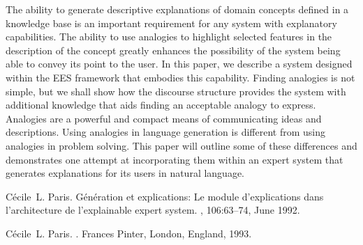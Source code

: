 \begin{thebibliography}{10}
{\leftskip=0.1in\rightskip=0.1in\begin{small}\par{}The
  ability to generate descriptive explanations of domain concepts defined in a
  knowledge base is an important requirement for any system with explanatory
  capabilities. The ability to use analogies to highlight selected features in
  the description of the concept greatly enhances the possibility of the system
  being able to convey its point to the user. In this paper, we describe a
  system designed within the EES framework that embodies this capability.
  Finding analogies is not simple, but we shall show how the discourse
  structure provides the system with additional knowledge that aids finding an
  acceptable analogy to express. Analogies are a powerful and compact means of
  communicating ideas and descriptions. Using analogies in language generation
  is different from using analogies in problem solving. This paper will outline
  some of these differences and demonstrates one attempt at incorporating them
  within an expert system that generates explanations for its users in natural
  language.\end{small}\par}
\noindent\hspace*{\itemindent}{\leftskip=0.1in\rightskip=0.1in\hrulefill}

C\'{e}cile~L. Paris.
\newblock G\'en\'eration et explications: Le module d'explications dans
  l'architecture de l'explainable expert system.
, 106:63--74, June 1992.

\noindent\hspace*{\itemindent}{\leftskip=0.1in\rightskip=0.1in\hrulefill}

C\'{e}cile~L. Paris.
.
\newblock Frances Pinter, London, England, 1993.


\end{thebibliography}

